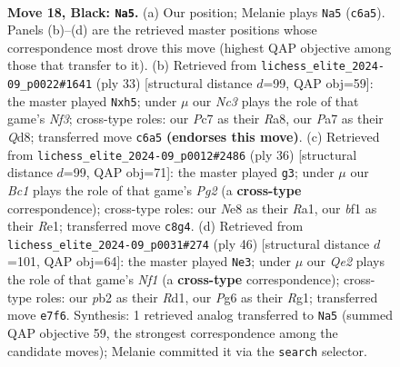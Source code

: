 \documentclass[11pt]{article}
\begin{document}
\clearpage

\begin{figure}[p]\centering
\begin{subfigure}{0.46\textwidth}\centering
\resizebox{\linewidth}{!}{%
\newchessgame
\chessboard[
  setfen={1rbrn1k1/p1p1qp2/2n3p1/2PpP2p/1p1N4/1Q2P1P1/PP1B1P1P/2K1RBR1 b - - 1 18},
  showmover=false,
  pgfstyle=straightmove, color=movearrow, markmove={c6-a5}
]}
\caption{}
\end{subfigure}\hfill
\begin{subfigure}{0.46\textwidth}\centering
\resizebox{\linewidth}{!}{%
\newchessgame
\chessboard[
  setfen={r2qr1k1/1p1b1p2/2pp1n1p/p4npN/P1P1p3/1PP1P1PP/5PB1/R1BQ1RK1 b - - 1 17},
  showmover=false,
  pgfstyle=straightmove, color=movearrow, markmove={f6-h5}
]}
\caption{}
\end{subfigure}
\\[4pt]
\begin{subfigure}{0.46\textwidth}\centering
\resizebox{\linewidth}{!}{%
\newchessgame
\chessboard[
  setfen={1r1qr1k1/5pp1/b3pbnp/1p1p3N/pP1P4/P1PQ1N2/2B2PPP/R3R1K1 w - - 8 19},
  showmover=false,
  pgfstyle=straightmove, color=movearrow, markmove={g2-g3}
]}
\caption{}
\end{subfigure}\hfill
\begin{subfigure}{0.46\textwidth}\centering
\resizebox{\linewidth}{!}{%
\newchessgame
\chessboard[
  setfen={r1b1r1k1/ppp3q1/3p4/2nP1p1p/2P1pPnP/2N5/PP2Q1P1/1BKR1NR1 w - - 3 24},
  showmover=false,
  pgfstyle=straightmove, color=movearrow, markmove={f1-e3}
]}
\caption{}
\end{subfigure}
\caption{\textbf{Move 18, Black: \texttt{Na5}.} (a) Our position; Melanie plays \texttt{Na5} (\texttt{c6a5}). Panels (b)--(d) are the retrieved master positions whose correspondence most drove this move (highest QAP objective among those that transfer to it). (b) Retrieved from \texttt{lichess\_elite\_2024-09\_p0022\#1641} (ply 33) [structural distance $d$=99, QAP obj=59]: the master played \texttt{Nxh5}; under $\mu$ our \emph{Nc3} plays the role of that game's \emph{Nf3}; cross-type roles: our \emph{P}c7 as their \emph{R}a8, our \emph{P}a7 as their \emph{Q}d8; transferred move \texttt{c6a5} \textbf{(endorses this move)}. (c) Retrieved from \texttt{lichess\_elite\_2024-09\_p0012\#2486} (ply 36) [structural distance $d$=99, QAP obj=71]: the master played \texttt{g3}; under $\mu$ our \emph{Bc1} plays the role of that game's \emph{Pg2} (a \textbf{cross-type} correspondence); cross-type roles: our \emph{N}e8 as their \emph{R}a1, our \emph{b}f1 as their \emph{R}e1; transferred move \texttt{c8g4}. (d) Retrieved from \texttt{lichess\_elite\_2024-09\_p0031\#274} (ply 46) [structural distance $d$=101, QAP obj=64]: the master played \texttt{Ne3}; under $\mu$ our \emph{Qe2} plays the role of that game's \emph{Nf1} (a \textbf{cross-type} correspondence); cross-type roles: our \emph{p}b2 as their \emph{R}d1, our \emph{P}g6 as their \emph{R}g1; transferred move \texttt{e7f6}. Synthesis: 1 retrieved analog transferred to \texttt{Na5} (summed QAP objective 59, the strongest correspondence among the candidate moves); Melanie committed it via the \texttt{search} selector.}
\label{fig:thought-m35}
\end{figure}
\end{document}
